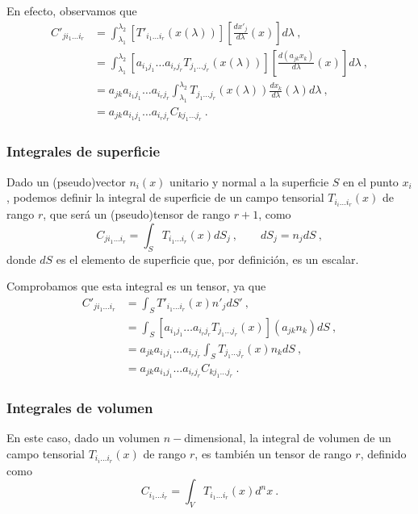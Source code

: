 En efecto, observamos que
\begin{align}
    C'_{j i_1 \dots i_r} & = \int_{\lambda_1}^{\lambda_2} [T'_{i_1 \dots i_r}(x(\lambda))] \left[ \frac{dx'_j}{d\lambda}(x) \right] d\lambda \ , \\
    & = \int_{\lambda_1}^{\lambda_2} [a_{i_1 j_1} \dots a_{i_r j_r} T_{j_1 \dots j_r}(x(\lambda))] \left[ \frac{d(a_{jk}x_k)}{d\lambda}(x) \right] d\lambda \ , \\
    & = a_{jk} a_{i_1 j_1} \dots a_{i_r j_r} \int_{\lambda_1}^{\lambda_2} T_{j_1 \dots j_r}(x(\lambda)) \frac{dx_k}{d\lambda}(\lambda) d\lambda \ , \\
    & = a_{jk} a_{i_1 j_1} \dots a_{i_r j_r} C_{k j_1 \dots j_r} \ .
\end{align}

\subsubsection*{Integrales de superficie}

Dado un (pseudo)vector $n_i(x)$ unitario y normal a la superficie $S$ en el punto $x_i$, podemos definir la integral de superficie de un campo tensorial $T_{i_i \dots i_r}(x)$ de rango $r$, que será un (pseudo)tensor de rango $r+1$, como
\begin{equation}
    C_{j i_1 \dots i_r} = \int_S T_{i_1 \dots i_r} (x) dS_j \ , \qquad dS_j = n_j dS \ ,
\end{equation}
donde $dS$ es el elemento de superficie que, por definición, es un escalar.

Comprobamos que esta integral es un tensor, ya que
\begin{align}
    C'_{j i_1 \dots i_r} & = \int_S T'_{i_1 \dots i_r}(x) n'_j dS' \ , \\
    & = \int_S [a_{i_1 j_1} \dots a_{i_r j_r} T_{j_1 \dots j_r}(x)](a_{jk} n_k) dS \ , \\
    & = a_{jk} a_{i_1 j_1} \dots a_{i_r j_r} \int_S T_{j_1 \dots j_r}(x) n_k dS \ , \\
    & = a_{jk} a_{i_1 j_1} \dots a_{i_r j_r} C_{k j_1 \dots j_r} \ .
\end{align}

\subsubsection*{Integrales de volumen}

En este caso, dado un volumen $n-$dimensional, la integral de volumen de un campo tensorial $T_{i_i \dots i_r}(x)$ de rango $r$, es también un tensor de rango $r$, definido como
\begin{equation}
    C_{i_1 \dots i_r} = \int_V T_{i_1 \dots i_r}(x) d^n x \ .
\end{equation}

